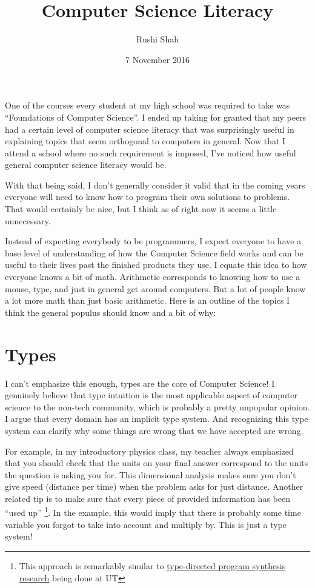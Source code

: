 \documentclass[12pt]{article}
\title{Computer Science Literacy}
\author{Rushi Shah}
\date{7 November 2016}
\begin{document}
  \maketitle

    One of the courses every student at my high school was required to take was ``Foundations of Computer Science''. I ended up taking for granted that my peers had a certain level of computer science literacy that was surprisingly useful in explaining topics that seem orthogonal to computers in general. Now that I attend a school where no such requirement is imposed, I've noticed how useful general computer science literacy would be. 

    With that being said, I don't generally consider it valid that in the coming years everyone will need to know how to program their own solutions to problems. That would certainly be nice, but I think as of right now it seems a little unnecessary. 

    Instead of expecting everybody to be programmers, I expect everyone to have a base level of understanding of how the Computer Science field works and can be useful to their lives past the finished products they use. I equate this idea to how everyone knows a bit of math. Arithmetic corresponds to knowing how to use a mouse, type, and just in general get around computers. But a lot of people know a lot more math than just basic arithmetic. Here is an outline of the topics I think the general populus should know and a bit of why:

    \section{Types}

      I can't emphasize this enough, types are the core of Computer Science! I genuinely believe that type intuition is the most applicable aspect of computer science to the non-tech community, which is probably a pretty unpopular opinion. I argue that every domain has an implicit type system. And recognizing this type system can clarify why some things are wrong that we have accepted are wrong. 

      For example, in my introductory physics class, my teacher always emphasized that you should check that the units on your final answer correspond to the units the question is asking you for. This dimensional analysis makes sure you don't give speed (distance per time) when the problem asks for just distance. Another related tip is to make sure that every piece of provided information has been ``used up'' \footnote{This approach is remarkably similar to \href{http://www.cs.utexas.edu/~yufeng/papers/sypet.pdf}{type-directed program synthesis research} being done at UT}. In the example, this would imply that there is probably some time variable you forgot to take into account and multiply by.  This is just a type system!
\end{document}
